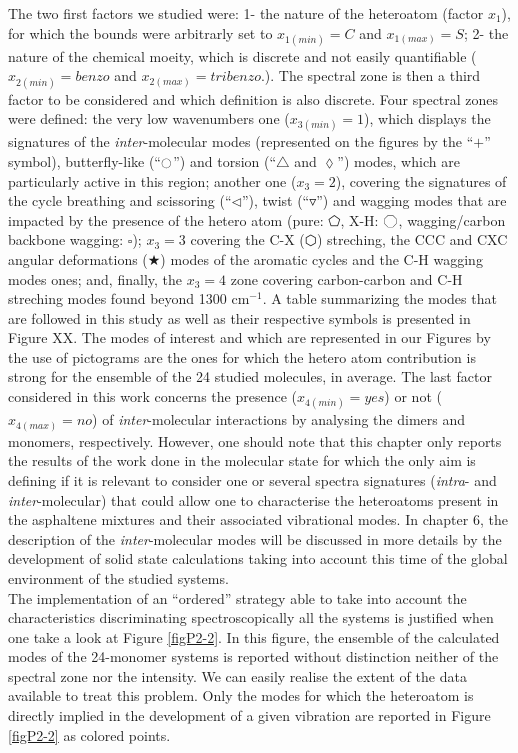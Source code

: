 	The two first factors we studied were: 1- the nature of the heteroatom (factor $x_1$), for which the bounds were arbitrarly set to $x_{1(min)}=C$ and $x_{1(max)}=S$; 2- the nature of the chemical moeity, which is discrete and not easily quantifiable ($x_{2(min)}=benzo$ and $x_{2(max)}=tribenzo$.). The spectral zone is then a third factor to be considered and which definition is also discrete. 
	Four spectral zones were defined: the very low wavenumbers one ($x_{3(min)}=1$), which displays the signatures of the \textit{inter}-molecular modes (represented on the figures by the “$ + $” symbol), butterfly-like (“$\ocircle$”) and torsion (“$\triangle$ and $\lozenge$”) modes, which are particularly active in this region; another one ($x_3=2$), covering the signatures of the cycle breathing and scissoring (“$\lhd$”), twist (“$\triangledown$”) and wagging modes that are impacted by the presence of the hetero atom (pure: $\pentagon$, X-H: $\octagon$, wagging/carbon backbone wagging: $\square$); $x_3=3$ covering the C-X ($\varhexagon$) streching, the CCC and CXC angular deformations ($\bigstar$) modes of the aromatic cycles and the C-H wagging modes ones; and, finally, the $x_3=4$ zone covering carbon-carbon and C-H streching modes found beyond 1300 cm$^{-1}$.  A table summarizing the modes that are followed in this study as well as their respective symbols is presented in Figure XX. The modes of interest and which are represented in our Figures by the use of pictograms are the ones for which the hetero atom contribution is strong for the ensemble of the 24 studied molecules, in average. The last factor considered in this work concerns the presence ($x_{4(min)}=yes$) or not ($x_{4(max)}=no$) of \textit{inter}-molecular interactions by analysing the dimers and monomers, respectively. However, one should note that this chapter only reports the results of the work done in the molecular state for which the only aim is defining if it is relevant to consider one or several spectra signatures (\textit{intra}- and \textit{inter}-molecular) that could allow one to characterise the heteroatoms present in the asphaltene mixtures and their associated vibrational modes. In chapter 6, the description of the \textit{inter}-molecular modes will be discussed in more details by the development of solid state calculations taking into account this time of the global environment of the studied systems.\\
	
	The implementation of an “ordered” strategy able to take into account the characteristics discriminating spectroscopically all the systems is justified when one take a look at Figure \ref{figP2-2}. In this figure, the ensemble of the calculated modes of the 24-monomer systems is reported without distinction neither of the spectral zone nor the intensity. We can easily realise the extent of the data available to treat this problem. Only the modes for which the heteroatom is directly implied  in the development of a given vibration are reported in Figure \ref{figP2-2} as colored points.
	
